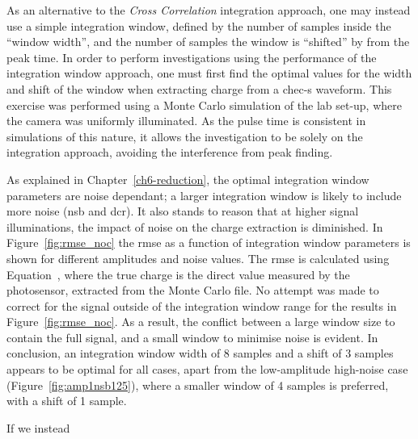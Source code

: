 As an alternative to the \textit{Cross Correlation} integration approach, one may instead use a simple integration window, defined by the number of samples inside the ``window width'', and the number of samples the window is ``shifted'' by from the peak time. In order to perform investigations using the performance of the integration window approach, one must first find the optimal values for the width and shift of the window when extracting charge from a \gls{chec-s} waveform. This exercise was performed using a Monte Carlo simulation of the lab set-up, where the camera was uniformly illuminated. As the pulse time is consistent in simulations of this nature, it allows the investigation to be solely on the integration approach, avoiding the interference from peak finding.

As explained in Chapter~\ref{ch6-reduction}, the optimal integration window parameters are noise dependant; a larger integration window is likely to include more noise (\gls{nsb} and \gls{dcr}). It also stands to reason that at higher signal illuminations, the impact of noise on the charge extraction is diminished. In Figure~\ref{fig:rmse_noc} the \gls{rmse} as a function of integration window parameters is shown for different amplitudes and noise values. The \gls{rmse} is calculated using Equation~\label{eq:charge_res}, where the true charge is the direct value measured by the photosensor, extracted from the Monte Carlo file. No attempt was made to correct for the signal outside of the integration window range for the results in Figure~\ref{fig:rmse_noc}. As a result, the conflict between a large window size to contain the full signal, and a small window to minimise noise is evident. In conclusion, an integration window width of 8 samples and a shift of 3 samples appears to be optimal for all cases, apart from the low-amplitude high-noise case (Figure~\ref{fig:amp1nsb125}), where a smaller window of 4 samples is preferred, with a shift of 1 sample. 

If we instead






